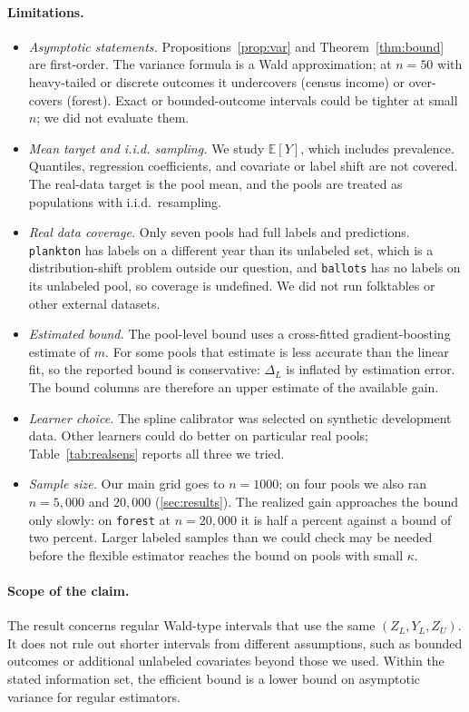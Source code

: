 \paragraph{Limitations.}
\begin{itemize}
  \item \emph{Asymptotic statements.} Propositions~\ref{prop:var} and Theorem~\ref{thm:bound} are first-order. The variance formula is a Wald approximation; at $n=50$ with heavy-tailed or discrete outcomes it undercovers (census income) or over-covers (forest). Exact or bounded-outcome intervals could be tighter at small $n$; we did not evaluate them.
  \item \emph{Mean target and i.i.d. sampling.} We study $\mathbb E[Y]$, which includes prevalence. Quantiles, regression coefficients, and covariate or label shift are not covered. The real-data target is the pool mean, and the pools are treated as populations with i.i.d.\ resampling.
  \item \emph{Real data coverage.} Only seven pools had full labels and predictions. \texttt{plankton} has labels on a different year than its unlabeled set, which is a distribution-shift problem outside our question, and \texttt{ballots} has no labels on its unlabeled pool, so coverage is undefined. We did not run folktables or other external datasets.
  \item \emph{Estimated bound.} The pool-level bound uses a cross-fitted gradient-boosting estimate of $m$. For some pools that estimate is less accurate than the linear fit, so the reported bound is conservative: $\Delta_L$ is inflated by estimation error. The bound columns are therefore an upper estimate of the available gain.
  \item \emph{Learner choice.} The spline calibrator was selected on synthetic development data. Other learners could do better on particular real pools; Table~\ref{tab:realsens} reports all three we tried.
  \item \emph{Sample size.} Our main grid goes to $n=1000$; on four pools we also ran $n=5{,}000$ and $20{,}000$ (\cref{sec:results}). The realized gain approaches the bound only slowly: on \texttt{forest} at $n=20{,}000$ it is half a percent against a bound of two percent. Larger labeled samples than we could check may be needed before the flexible estimator reaches the bound on pools with small $\kappa$.
\end{itemize}

\paragraph{Scope of the claim.}
The result concerns regular Wald-type intervals that use the same $(Z_L,Y_L,Z_U)$. It does not rule out shorter intervals from different assumptions, such as bounded outcomes or additional unlabeled covariates beyond those we used. Within the stated information set, the efficient bound is a lower bound on asymptotic variance for regular estimators.
